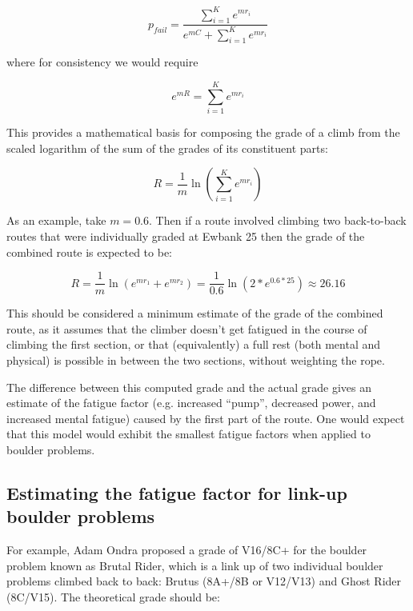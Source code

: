 \documentclass[11pt]{article}
\begin{document}
\begin{equation}
p_{fail} = \frac{\sum_{i=1}^{K}e^{mr_i}}{e^{mC} + \sum_{i=1}^{K}e^{mr_i}}
\label{compose}
\end{equation} 

where for consistency we would require

\begin{equation}
e^{mR} = \sum_{i=1}^{K}e^{mr_i}
\end{equation} 

This provides a mathematical basis for composing the grade of a climb from the scaled logarithm of the sum of the grades of its constituent parts:

\begin{equation}
R = \frac{1}{m} \ln \left(\sum_{i=1}^{K}e^{mr_i}\right)
\end{equation} 

As an example, take $m=0.6$. Then if a route involved climbing two back-to-back routes that were individually graded at Ewbank 25 then the grade of the combined route is expected to be:

\begin{equation}
R = \frac{1}{m} \ln \left(e^{mr_1} + e^{mr_2}\right) = \frac{1}{0.6} \ln \left(2 * e^{0.6 * 25}\right) \approx 26.16
\end{equation} 

This should be considered a minimum estimate of the grade of the combined route, as it assumes that the climber doesn't get fatigued in the course of climbing the first section, or that (equivalently) a full rest (both mental and physical) is possible in between the two sections, without weighting the rope.

The difference between this computed grade and the actual grade gives an estimate of the fatigue factor (e.g. increased ``pump'', decreased power, and increased mental fatigue) caused by the first part of the route. One would expect that this model would exhibit the smallest fatigue factors when applied to boulder problems. 

\subsection*{Estimating the fatigue factor for link-up boulder problems}


For example, Adam Ondra proposed a grade of V16/8C+ for the boulder problem known as Brutal Rider, which is a link up of two individual boulder problems climbed back to back: Brutus (8A+/8B or V12/V13) and Ghost Rider (8C/V15). The theoretical grade should be:
\end{document}
